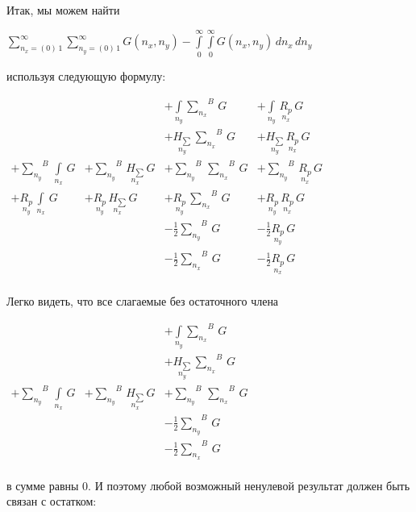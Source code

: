 \documentclass[11pt]{article}
\begin{document}
    Итак, мы можем найти

\(\sum\limits_{n_x=\left(0\right)\,1}^{\infty} \sum\limits_{n_y=\left(0\right)\,1}^{\infty} G\left(n_x, n_y\right) - \int\limits_{0}^{\infty} \int\limits_{0}^{\infty} G\left(n_x, n_y\right)\,d{n_x}\,d{n_y}\)

используя следующую формулу:

    \(\begin{array}{llll}  \,&  \,&  + \int\limits_{n_y}^{}{\sum\limits_{n_x}^{}}^{B}\,G &  + \int\limits_{n_y}^{}\,\underset{n_x}{R_{p}}\,G \\  \,&  \,&  + \underset{n_y}{H_{\sum}}\,{\sum\limits_{n_x}^{}}^{B}\,G &  + \underset{n_y}{H_{\sum}}\,\underset{n_x}{R_{p}}\,G \\  + {\sum\limits_{n_y}^{}}^{B}\,\int\limits_{n_x}^{}\,G &  + {\sum\limits_{n_y}^{}}^{B}\,\underset{n_x}{H_{\sum}}\,G &  + {\sum\limits_{n_y}^{}}^{B}\,{\sum\limits_{n_x}^{}}^{B}\,G &  + {\sum\limits_{n_y}^{}}^{B}\,\underset{n_x}{R_{p}}\,G \\  + \underset{n_y}{R_{p}}\,\int\limits_{n_x}^{}\,G &  + \underset{n_y}{R_{p}}\,\underset{n_x}{H_{\sum}}\,G &  + \underset{n_y}{R_{p}}\,{\sum\limits_{n_x}^{}}^{B}\,G &  + \underset{n_y}{R_{p}}\,\underset{n_x}{R_{p}}\,G \\  \,&  \,&  - \frac{1}{2}{\sum\limits_{n_y}^{}}^{B}\,G &  - \frac{1}{2}\underset{n_y}{R_{p}}\,G \\  \,&  \,&  - \frac{1}{2}{\sum\limits_{n_x}^{}}^{B}\,G &  - \frac{1}{2}\underset{n_x}{R_{p}}\,G \\ \end{array}\)

    Легко видеть, что все слагаемые без остаточного члена

    \(\begin{array}{llll}  \,&  \,&  + \int\limits_{n_y}^{}{\sum\limits_{n_x}^{}}^{B}\,G \\  \,&  \,&  + \underset{n_y}{H_{\sum}}\,{\sum\limits_{n_x}^{}}^{B}\,G \\  + {\sum\limits_{n_y}^{}}^{B}\,\int\limits_{n_x}^{}\,G &  + {\sum\limits_{n_y}^{}}^{B}\,\underset{n_x}{H_{\sum}}\,G &  + {\sum\limits_{n_y}^{}}^{B}\,{\sum\limits_{n_x}^{}}^{B}\,G\\  \,&  \,&  - \frac{1}{2}{\sum\limits_{n_y}^{}}^{B}\,G \\  \,&  \,&  - \frac{1}{2}{\sum\limits_{n_x}^{}}^{B}\,G \\ \end{array}\)

    в сумме равны 0. И поэтому любой возможный ненулевой результат должен
быть связан с остатком:
\end{document}
